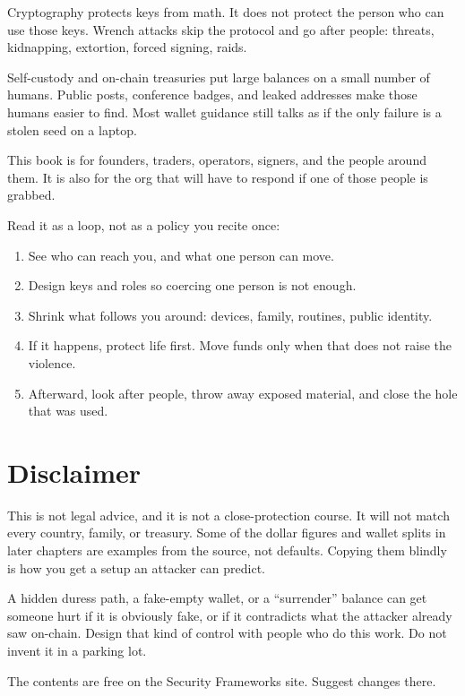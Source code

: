 Cryptography protects keys from math. It does not protect
the person who can use those keys. Wrench attacks skip
the protocol and go after people: threats, kidnapping,
extortion, forced signing, raids.

Self-custody and on-chain treasuries put large balances
on a small number of humans. Public posts, conference
badges, and leaked addresses make those humans easier to
find. Most wallet guidance still talks as if the only
failure is a stolen seed on a laptop.

This book is for founders, traders, operators, signers,
and the people around them. It is also for the org that
will have to respond if one of those people is grabbed.

Read it as a loop, not as a policy you recite once:

\begin{enumerate}
  \item See who can reach you, and what one person can
  move.
  \item Design keys and roles so coercing one person is
  not enough.
  \item Shrink what follows you around: devices, family,
  routines, public identity.
  \item If it happens, protect life first. Move funds
  only when that does not raise the violence.
  \item Afterward, look after people, throw away exposed
  material, and close the hole that was used.
\end{enumerate}

\section{Disclaimer}

This is not legal advice, and it is not a close-protection
course. It will not match every country, family, or
treasury. Some of the dollar figures and wallet splits
in later chapters are examples from the source, not
defaults. Copying them blindly is how you get a setup
an attacker can predict.

A hidden duress path, a fake-empty wallet, or a
``surrender'' balance can get someone hurt if it is
obviously fake, or if it contradicts what the attacker
already saw on-chain. Design that kind of control with
people who do this work. Do not invent it in a parking
lot.

The contents are free on the Security Frameworks site.
Suggest changes there.

